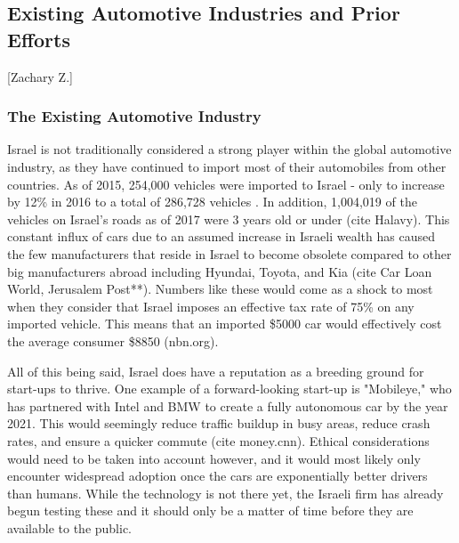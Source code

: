 \documentclass{article}                         %
\begin{document}
\subsection{Existing Automotive Industries and Prior Efforts}[Zachary Z.]

\subsubsection{The Existing Automotive Industry}
Israel is not traditionally considered a strong player within the global automotive industry, as they have continued to import most of their automobiles from other countries. As of 2015, 254,000 vehicles were imported to Israel - only to increase by 12\% in 2016 to a total of 286,728 vehicles \cite{}. In addition, 1,004,019 of the vehicles on Israel's roads as of 2017 were 3 years old or under (cite Halavy). This constant influx of cars due to an assumed increase in Israeli wealth has caused the few manufacturers that reside in Israel to become obsolete compared to other big manufacturers abroad including Hyundai, Toyota, and Kia (cite Car Loan World, Jerusalem Post**). Numbers like these would come as a shock to most when they consider that Israel imposes an effective tax rate of 75\% on any imported vehicle. This means that an imported \$5000 car would effectively cost the average consumer \$8850 (nbn.org). 

All of this being said, Israel does have a reputation as a breeding ground for start-ups to thrive. One example of a forward-looking start-up is "Mobileye," who has partnered with Intel and BMW to create a fully autonomous car by the year 2021. This would seemingly reduce traffic buildup in busy areas, reduce crash rates, and ensure a quicker commute (cite money.cnn). Ethical considerations would need to be taken into account however, and it would most likely only encounter widespread adoption once the cars are exponentially better drivers than humans. While the technology is not there yet, the Israeli firm has already begun testing these and it should only be a matter of time before they are available to the public.  
\end{document}
